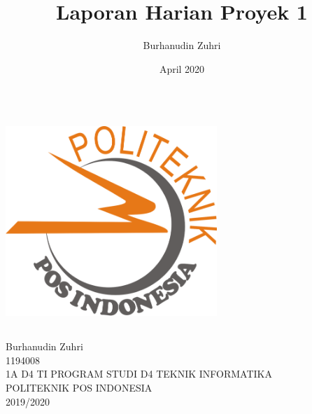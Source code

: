 \documentclass{article}
\title{Laporan Harian Proyek 1}
\author{Burhanudin Zuhri}
\date{April 2020}
\begin{document}
\maketitle
	\begin{center}
		\includegraphics[width=8cm,height=8cm]{logo.png}
	\end{center}
	\vspace{0.5 cm}
	
	\begin{center}
		Burhanudin Zuhri \\
		1194008 \\
		1A D4 TI \linebreak
		\newline
		\newline
		\newline
		\linebreak
		\newline
		\newline
		PROGRAM STUDI D4 TEKNIK INFORMATIKA \\
		POLITEKNIK POS INDONESIA\\
		2019/2020\\
	\end{center}
\end{document}
